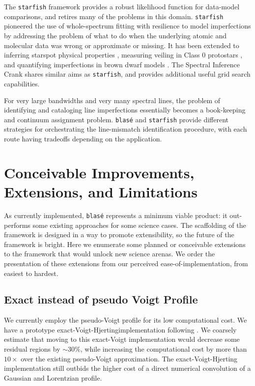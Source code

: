 \documentclass[modern]{aastex631}
\begin{document}
The \texttt{starfish} framework \citep{czekala15} provides a robust likelihood function for data-model comparisons, and retires many of the problems in this domain.  \texttt{starfish} pioneered the use of whole-spectrum fitting with resilience to model imperfections by addressing the problem of what to do when the underlying atomic and molecular data was wrong or approximate or missing.  It has been extended to inferring starspot physical properties \citep{2017ApJ...836..200G}, measuring veiling in Class 0 protostars \citep{2018ApJ...862...85G}, and quantifying imperfections in brown dwarf models \citep{2021ApJ...921...95Z}.  The Spectral Inference Crank \citep[\texttt{sick},][]{2016ApJS..223....8C} shares similar aims as \texttt{starfish}, and provides additional useful grid search capabilities.

For very large bandwidths and very many spectral lines, the problem of identifying and cataloging line imperfections essentially becomes a book-keeping and continuum assignment problem.  \texttt{blas\'e} and \texttt{starfish} provide different strategies for orchestrating the line-mismatch identification procedure, with each route having tradeoffs depending on the application.


\section{Conceivable Improvements, Extensions, and Limitations}

As currently implemented, \texttt{blas\'e} represents a minimum viable product: it out-performs some existing approaches for some science cases.  The scaffolding of the framework is designed in a way to promote extensibility, so the future of the framework is bright.  Here we enumerate some planned or conceivable extensions to the framework that would unlock new science arenas.  We order the presentation of these extensions from our perceived ease-of-implementation, from easiest to hardest.

\subsection{Exact instead of pseudo Voigt Profile}
We currently employ the pseudo-Voigt profile for its low computational cost.  We have a prototype exact-Voigt-Hjertingimplementation following \citet{2022ApJS..258...31K}.  We coarsely estimate that moving to this exact-Voigt implementation wculd decrease some residual regions by $\sim 30\%$, while increasing the computational cost by more than $10\times$ over the existing pseudo-Voigt approximation.  The exact-Voigt-Hjerting implementation still outbids the higher cost of a direct numerical convolution of a Gaussian and Lorentzian profile.
\end{document}
